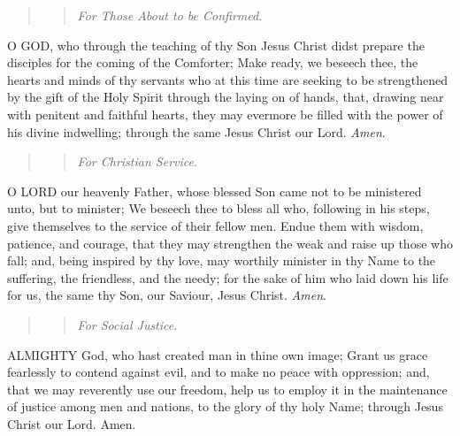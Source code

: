 \begin{quote}

\begin{quote}

\emph{For
Those About to be Confirmed}.

\end{quote}

\end{quote}

O
GOD, who through the teaching of thy Son Jesus Christ didst prepare the
disciples for the coming of the Comforter; Make ready, we beseech thee,
the hearts and minds of thy servants who at this time are seeking to be
strengthened by the gift of the Holy Spirit through the laying on of hands,
that, drawing near with penitent and faithful hearts, they may evermore
be filled with the power of his divine indwelling; through the same Jesus
Christ our Lord. \emph{Amen}.

\begin{quote}

\begin{quote}

\emph{For
Christian Service}.

\end{quote}

\end{quote}

O
LORD our heavenly Father, whose blessed Son came not to be ministered
unto, but to minister; We beseech thee to bless all who, following in
his steps, give themselves to the service of their fellow men. Endue them
with wisdom, patience, and courage, that they may strengthen the weak
and raise up those who fall; and, being inspired by thy love, may worthily
minister in thy Name to the suffering, the friendless, and the needy;
for the sake of him who laid down his life for us, the same thy Son, our
Saviour, Jesus Christ. \emph{Amen}.

\begin{quote}

\begin{quote}

\emph{For
Social Justice}.

\end{quote}

\end{quote}

ALMIGHTY
God, who hast created man in thine own image; Grant us grace fearlessly
to contend against evil, and to make no peace with oppression; and, that
we may reverently use our freedom, help us to employ it in the maintenance
of justice among men and nations, to the glory of thy holy Name; through
Jesus Christ our Lord. Amen.

